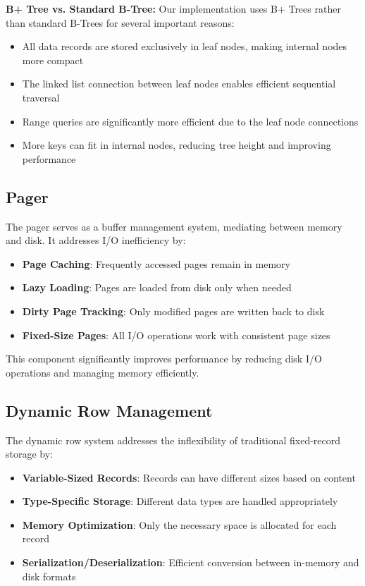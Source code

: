 \documentclass[12pt,a4paper]{article}  %
\newenvironment{highlight}{%
  \begin{tcolorbox}[
    colback=lightgray,
    colframe=uetblue,
    boxrule=0.5pt,
    arc=2mm,
    beforeafter skip=12pt,
    width=\textwidth,
    enlarge left by=-2mm,
    enlarge right by=-2mm
  ]
}{%
  \end{tcolorbox}
}
\begin{document}
\begin{highlight}
\textbf{B+ Tree vs. Standard B-Tree:} Our implementation uses B+ Trees rather than standard B-Trees for several important reasons:
\begin{itemize}
    \item All data records are stored exclusively in leaf nodes, making internal nodes more compact
    \item The linked list connection between leaf nodes enables efficient sequential traversal
    \item Range queries are significantly more efficient due to the leaf node connections
    \item More keys can fit in internal nodes, reducing tree height and improving performance
\end{itemize}
\end{highlight}

\subsection{Pager}
The pager serves as a buffer management system, mediating between memory and disk. It addresses I/O inefficiency by:

\begin{itemize}
    \item \textbf{Page Caching}: Frequently accessed pages remain in memory
    \item \textbf{Lazy Loading}: Pages are loaded from disk only when needed
    \item \textbf{Dirty Page Tracking}: Only modified pages are written back to disk
    \item \textbf{Fixed-Size Pages}: All I/O operations work with consistent page sizes
\end{itemize}

This component significantly improves performance by reducing disk I/O operations and managing memory efficiently.

\subsection{Dynamic Row Management}
The dynamic row system addresses the inflexibility of traditional fixed-record storage by:

\begin{itemize}
    \item \textbf{Variable-Sized Records}: Records can have different sizes based on content
    \item \textbf{Type-Specific Storage}: Different data types are handled appropriately
    \item \textbf{Memory Optimization}: Only the necessary space is allocated for each record
    \item \textbf{Serialization/Deserialization}: Efficient conversion between in-memory and disk formats
\end{itemize}
\end{document}

